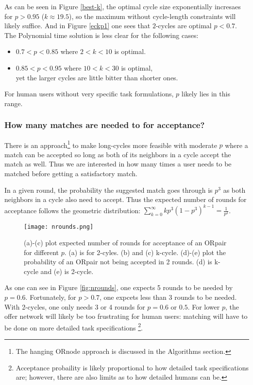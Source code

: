 \documentclass[main.tex]{subfiles}
\begin{document}
As can be seen in Figure \ref{best-k}, the optimal cycle size exponentially incresaes for $p > 0.95$ ($k \approx 19.5$), so the maximum without cycle-length constraints will likely suffice. And in Figure \ref{eckp1} one sees that $2$-cycles are optimal $p < 0.7$. The Polynomial time solution is less clear for the following cases:
\begin{itemize}
  \item $0.7 < p < 0.85$ where $ 2 < k < 10$ is optimal.
  \item $0.85 < p < 0.95$ where $ 10 < k < 30$ is optimal,
      \\yet the larger cycles are little bitter than shorter ones.
\end{itemize}

For human users without very specific task formulations, $p$ likely lies in this range.

\subsubsection{How many matches are needed to for acceptance?}
There is an approach\footnote{The hanging ORnode approach is discussed in the Algorithms section.} to make long-cycles more feasible with moderate $p$ where a match can be accepted so long as both of its neighbors in a cycle accept the match as well. Thus we are interested in how many times a user needs to be matched before getting a satisfactory match.

In a given round, the probability the suggested match goes through is $p^3$ as both neighbors in a cycle also need to accept. Thus the expected number of rounds for acceptance follows the geometric distribution: $\sum_{k=0}^{\infty} k p^3 (1 - p^3)^{k-1} = \frac{1}{p^3}$.

\begin{figure}
  \texttt{[image: nrounds.png]}
  \caption{(a)-(c) plot expected number of rounds for acceptance of an ORpair for different $p$. (a) is for 2-cyles. (b) and (c) k-cycle. (d)-(e) plot the probability of an ORpair not being accepted in 2 rounds. (d) is k-cycle and (e) is 2-cycle.}
  \label{nrounds}
\end{figure}

As one can see in Figure \ref{fig:nrounds}, one expects 5 rounds to be needed by $p = 0.6$. Fortunately, for $p > 0.7$, one expcets less than 3 rounds to be needed. With 2-cycles, one only needs 3 or 4 rounds for $p = 0.6$ or $0.5$. For lower $p$, the offer network will likely be too frustrating for human users: matching will have to be done on more detailed task specifications \footnote{Acceptance probaility is likely proportional to how detailed task specifications are; however, there are also limits as to how detailed humans can be.}.
\end{document}
